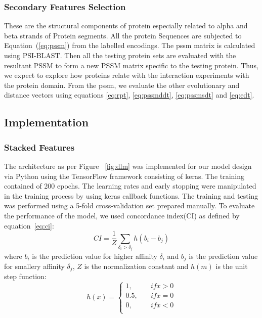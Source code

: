 \subsubsection{Secondary Features Selection}
These are the structural components of protein especially related to alpha and beta strands of Protein segments. All the protein Sequences are subjected to Equation~(\ref{eq:pssm}) from the labelled encodings. The \acrshort{pssm} matrix is calculated using PSI-BLAST\citep{Schaffer2001}. Then all the testing protein sets are evaluated with the resultant PSSM to form a new PSSM matrix specific to the testing protein. Thus, we expect to explore how proteins relate with the interaction experiments with the protein domain. From the \acrshort{pssm}, we evaluate the other evolutionary and distance vectors using equations \ref{eq:rpt}, \ref{eq:pssmddt}, \ref{eq:pssmsdt} and \ref{eq:edt}.

\subsection{Implementation}


\subsubsection{Stacked Features}
The architecture as per Figure ~\ref{fig:dlm} was implemented for our model design via Python using the TensorFlow framework consisting of keras. The training contained of 200 epochs. The learning rates and early stopping were manipulated in the training process by using keras callback functions. The training and testing was performed using a 5-fold cross-validation set prepared manually. To evaluate the performance of the model, we used concordance index(CI)\citep{Xu2015} as defined by equation~\ref{eq:ci}:
\begin{equation}
    CI = \frac{1}{Z} \sum_{\delta_i > \delta_j} h(b_i - b_j)
    \label{eq:ci}
\end{equation}
where $b_i$ is the prediction value for higher affinity $\delta_i$ and $b_j$ is the prediction value for smallery affinity $\delta_j$, $Z$ is the normalization constant and $h(m)$ is the unit step function:
\begin{equation} h(x) = 
    \begin{cases}
        1,& \quad {if x>0} \\
        0.5, & \quad{ if x=0 } \\
        0, & \quad{if x<0} \\
    \end{cases}
\end{equation}

